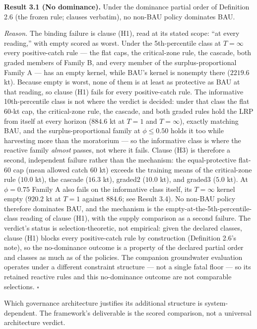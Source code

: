 \documentclass[11pt]{article}
\begin{document}
\textbf{Result 3.1 (No dominance).} Under the dominance partial order of
Definition 2.6 (the frozen rule; clauses verbatim), no non-BAU policy
dominates BAU.

\emph{Reason.} The binding failure is clause (H1), read at its stated
scope: ``at every reading,'' with empty scored as worst. Under the
5th-percentile class at \(T=\infty\) every positive-catch rule --- the
flat caps, the critical-zone rule, the cascade, both graded members of
Family B, and every member of the surplus-proportional Family A --- has
an empty kernel, while BAU's kernel is nonempty there (\(2219.6\) kt).
Because empty is worst, none of them is at least as protective as BAU at
that reading, so clause (H1) fails for every positive-catch rule. The
informative 10th-percentile class is not where the verdict is decided:
under that class the flat 60-kt cap, the critical-zone rule, the
cascade, and both graded rules hold the LRP from itself at every horizon
(\(884.6\) kt at \(T=1\) and \(T=\infty\)), exactly matching BAU, and
the surplus-proportional family at \(\phi \le 0.50\) holds it too while
harvesting more than the moratorium --- so the informative class is
where the reactive family \emph{almost} passes, not where it fails.
Clause (H3) is therefore a second, independent failure rather than the
mechanism: the equal-protective flat-60 cap (mean allowed catch \(60\)
kt) exceeds the training means of the critical-zone rule (\(10.0\) kt),
the cascade (\(16.3\) kt), graded2 (\(10.0\) kt), and graded3 (\(5.0\)
kt). At \(\phi = 0.75\) Family A also fails on the informative class
itself, its \(T=\infty\) kernel empty (\(920.2\) kt at \(T=1\) against
\(884.6\); see Result 3.4). No non-BAU policy therefore dominates BAU,
and the mechanism is the empty-at-the-5th-percentile-class reading of
clause (H1), with the supply comparison as a second failure. The
verdict's status is selection-theoretic, not empirical: given the
declared classes, clause (H1) blocks every positive-catch rule by
construction (Definition 2.6's note), so the no-dominance outcome is a
property of the declared partial order and classes as much as of the
policies. The companion groundwater evaluation operates under a
different constraint structure --- not a single fatal floor --- so its
retained reactive rules and this no-dominance outcome are not comparable
selections. \ensuremath{\square}

Which governance architecture justifies its additional structure is
system-dependent. The framework's deliverable is the scored comparison,
not a universal architecture verdict.
\end{document}
